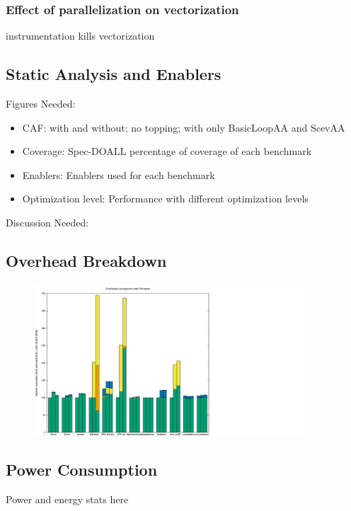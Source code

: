 \subsubsection{Effect of parallelization on vectorization}

instrumentation kills vectorization


\subsection{Static Analysis and Enablers}
Figures Needed:
\begin{itemize}
\item CAF: with and without; no topping; with only BasicLoopAA and ScevAA
\item Coverage: Spec-DOALL percentage of coverage of each benchmark
\item Enablers: Enablers used for each benchmark
\item Optimization level: Performance with different optimization levels
\end{itemize}

Discussion Needed:


\subsection{Overhead Breakdown}

\begin{figure}[htp]
  \includegraphics[width=0.9\textwidth]{figures/overheads}
\end{figure}

\subsection{Power Consumption}

Power and energy stats here

